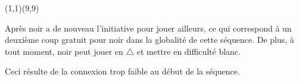 \documentclass[preview, border=0pt, varwidth=false]{standalone}
\begin{document}
	\setgounit{0.4cm} 
	
\parbox[c][14.65cm][c]{10.2cm}{
	\centering
	

	\begin{psgopartialboard}{(1,1)(9,9)}
		\pass
		\pass*
	\end{psgopartialboard}
	
	
	\vspace{1em}
	Après  noir a de nouveau l'initiative pour jouer ailleurs, ce qui correspond à un deuxième coup gratuit pour noir dans la globalité de cette séquence. De plus, à tout moment, noir peut jouer en $\triangle$ et mettre en difficulté blanc.

	\bigskip
	
	Ceci résulte de la connexion trop faible  au début de la séquence.

}
\end{document}
